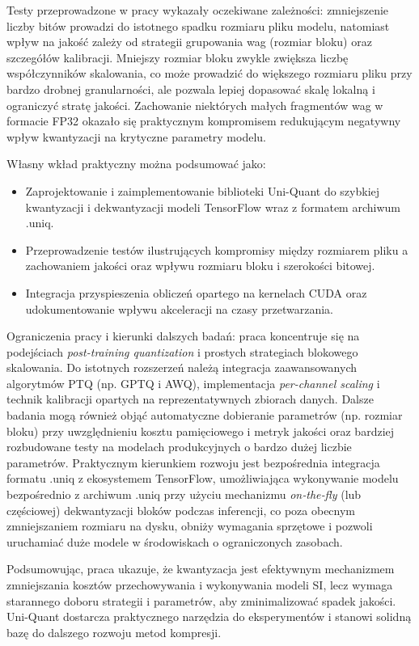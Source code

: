 Testy przeprowadzone w pracy wykazały oczekiwane zależności: zmniejszenie liczby bitów prowadzi do istotnego spadku rozmiaru pliku modelu, natomiast wpływ na jakość zależy od strategii grupowania wag (rozmiar bloku) oraz szczegółów kalibracji. Mniejszy rozmiar bloku zwykle zwiększa liczbę współczynników skalowania, co może prowadzić do większego rozmiaru pliku przy bardzo drobnej granularności, ale pozwala lepiej dopasować skalę lokalną i ograniczyć stratę jakości. Zachowanie niektórych małych fragmentów wag w formacie FP32 okazało się praktycznym kompromisem redukującym negatywny wpływ kwantyzacji na krytyczne parametry modelu.

Własny wkład praktyczny można podsumować jako:
\begin{itemize}
    \item Zaprojektowanie i zaimplementowanie biblioteki Uni-Quant do szybkiej kwantyzacji i dekwantyzacji modeli TensorFlow wraz z formatem archiwum .uniq.
    \item Przeprowadzenie testów ilustrujących kompromisy między rozmiarem pliku a zachowaniem jakości oraz wpływu rozmiaru bloku i szerokości bitowej.
    \item Integracja przyspieszenia obliczeń opartego na kernelach CUDA oraz udokumentowanie wpływu akceleracji na czasy przetwarzania.
\end{itemize}

Ograniczenia pracy i kierunki dalszych badań: praca koncentruje się na podejściach \textit{post-training quantization} i prostych strategiach blokowego skalowania. Do istotnych rozszerzeń należą integracja zaawansowanych algorytmów PTQ (np. GPTQ i AWQ), implementacja \textit{per-channel scaling} i technik kalibracji opartych na reprezentatywnych zbiorach danych. Dalsze badania mogą również objąć automatyczne dobieranie parametrów (np. rozmiar bloku) przy uwzględnieniu kosztu pamięciowego i metryk jakości oraz bardziej rozbudowane testy na modelach produkcyjnych o bardzo dużej liczbie parametrów. Praktycznym kierunkiem rozwoju jest bezpośrednia integracja formatu .uniq z ekosystemem TensorFlow, umożliwiająca wykonywanie modelu bezpośrednio z archiwum .uniq przy użyciu mechanizmu \textit{on‑the‑fly} (lub częściowej) dekwantyzacji bloków podczas inferencji, co poza obecnym zmniejszaniem rozmiaru na dysku, obniży wymagania sprzętowe i pozwoli uruchamiać duże modele w środowiskach o ograniczonych zasobach.

Podsumowując, praca ukazuje, że kwantyzacja jest efektywnym mechanizmem zmniejszania kosztów przechowywania i wykonywania modeli SI, lecz wymaga starannego doboru strategii i parametrów, aby zminimalizować spadek jakości. Uni-Quant dostarcza praktycznego narzędzia do eksperymentów i stanowi solidną bazę do dalszego rozwoju metod kompresji.
